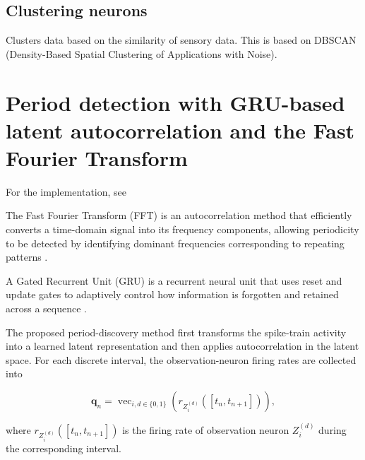 \documentclass[a4paper]{article}
\begin{document}
      \subsection{Clustering neurons}
         Clusters data based on the similarity of sensory data.
         This is based on DBSCAN (Density-Based Spatial Clustering of Applications with Noise).

   \section{Period detection with GRU-based latent autocorrelation and the Fast Fourier Transform\protect\footnotemark}

      For the implementation, see 

      The Fast Fourier Transform (FFT) is an autocorrelation method that efficiently converts a time-domain signal into its frequency components, allowing periodicity to be detected by identifying dominant frequencies corresponding to repeating patterns \cite{berberidis-2002-on-the-discovery-of-weak-periodicities-in-large-time-series}.

      A Gated Recurrent Unit (GRU) is a recurrent neural unit that uses reset and update gates to adaptively control how information is forgotten and retained across a sequence \cite{cho-2014-learning-phrase-representations-using-rnn-encoder-decoder-for-statistical-machine-translation}.

      The proposed period-discovery method first transforms the spike-train activity into a learned latent representation and then applies autocorrelation in the latent space. For each discrete interval, the observation-neuron firing rates are collected into

      \[
      \mathbf{q}_n
      =
      \operatorname{vec}_{i,d\in\{0,1\}}
      \left(
      r_{Z_i^{(d)}}([t_n,t_{n+1}])
      \right),
      \]

      where $r_{Z_i^{(d)}}([t_n,t_{n+1}])$ is the firing rate of observation neuron $Z_i^{(d)}$ during the corresponding interval.
\end{document}
